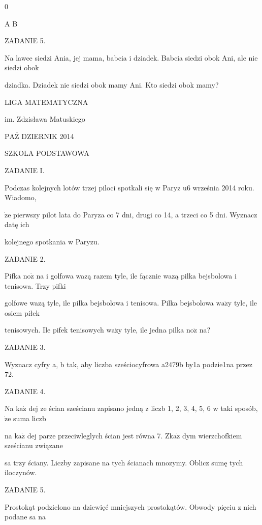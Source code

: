 \documentclass[a4paper,12pt]{article}
\begin{document}
0

A  B

ZADANIE 5.

Na lawce siedzi Ania, jej mama, babcia i dziadek. Babcia siedzi obok Ani, ale nie siedzi obok

dziadka. Dziadek nie siedzi obok mamy Ani. Kto siedzi obok mamy?






LIGA MATEMATYCZNA

im. Zdzisława Matuskiego

$\mathrm{P}\mathrm{A}\overline{\mathrm{Z}}$ DZIERNIK 2014

SZKOLA PODSTAWOWA

ZADANIE I.

Podczas kolejnych lotów trzej piloci spotkali się w Paryz $\mathrm{u}6$ września 2014 roku. Wiadomo,

$\dot{\mathrm{z}}\mathrm{e}$ pierwszy pilot lata do Paryza co 7 dni, drugi co 14, a trzeci co 5 dni. Wyznacz datę ich

kolejnego spotkania w Paryzu.

ZADANIE 2.

Pifka $\mathrm{n}\mathrm{o}\dot{\mathrm{z}}$ na i golfowa wazą razem tyle, ile fącznie wazą pilka bejsbolowa i tenisowa. Trzy pifki

golfowe wazą tyle, ile pilka bejsbolowa i tenisowa. Pilka bejsbolowa $\mathrm{w}\mathrm{a}\dot{\mathrm{z}}\mathrm{y}$ tyle, ile osiem piłek

tenisowych. Ile pifek tenisowych $\mathrm{w}\mathrm{a}\dot{\mathrm{z}}\mathrm{y}$ tyle, ile jedna pilka $\mathrm{n}\mathrm{o}\dot{\mathrm{z}}$ na?

ZADANIE 3.

Wyznacz cyfry a, b tak, aby liczba sześciocyfrowa a2479b by1a podzie1na przez 72.

ZADANIE 4.

Na $\mathrm{k}\mathrm{a}\dot{\mathrm{z}}$ dej ze ścian sześcianu zapisano jedną z liczb 1, 2, 3, 4, 5, 6 w taki sposób, $\dot{\mathrm{z}}\mathrm{e}$ suma liczb

na $\mathrm{k}\mathrm{a}\dot{\mathrm{z}}$ dej parze przeciwleglych ścian jest równa 7. $\mathrm{Z}\mathrm{k}\mathrm{a}\dot{\mathrm{z}}$ dym wierzchofkiem sześcianu związane

sa trzy ściany. Liczby zapisane na tych ścianach mnozymy. Oblicz sumę tych iloczynów.

ZADANIE 5.

Prostokąt podzielono na dziewięć mniejszych prostokątów. Obwody pięciu z nich podane sa na
\end{document}
